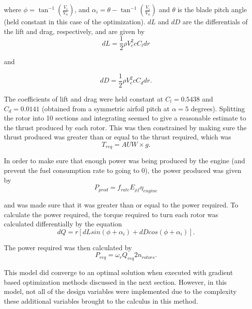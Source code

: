 \documentclass[letterpaper, 10 pt, conference]{ieeeconf}  %
\begin{document}
where $\phi = \tan^{-1}(\frac{V_i}{V_n})$, and $\alpha_i = \theta - \tan^{-1}(\frac{V_i}{V_n})$ and $\theta$ is the blade pitch angle (held constant in this case of the optimization). $dL$ and $dD$ are the differentials of the lift and drag, respectively, and are given by
\begin{equation}
	dL = \frac{1}{2}\rho V_e^2 c C_l dr
\end{equation}

and 

\begin{equation}
	dD = \frac{1}{2}\rho V_e^2 c C_d dr.
\end{equation}

The coefficients of lift and drag were held constant at $C_l = 0.5438$ and $C_d = 0.0141$ (obtained from a symmetric airfoil pitch at $\alpha = 5$ degrees). Splitting the rotor into 10 sections and integrating seemed to give a reasonable estimate to the thrust produced by each rotor. This was then constrained by making sure the thrust produced was greater than or equal to the thrust required, which was
\begin{equation}
	T_{req} = AUW\times g.
\end{equation}

In order to make sure that enough power was being produced by the engine (and prevent the fuel consumption rate to going to 0), the power produced was given by 
\begin{equation}
	P_{prod} = f_{rate}E_{\rho f} \eta_{engine}
\end{equation}

and was made sure that it was greater than or equal to the power required. To calculate the power required, the torque required to turn each rotor was calculated differentially by the equation
\begin{equation}
	dQ = r[dLsin(\phi + \alpha_i) + dDcos(\phi + \alpha_i)].
\end{equation}

The power required was then calculated by 
\begin{equation}
	P_{req} = \omega_rQ_{req}2n_{rotors}.
\end{equation}

This model did converge to an optimal solution when executed with gradient based optimization methods discussed in the next section. However, in this model, not all of the design variables were implemented due to the complexity these additional variables brought to the calculus in this method.
\end{document}
